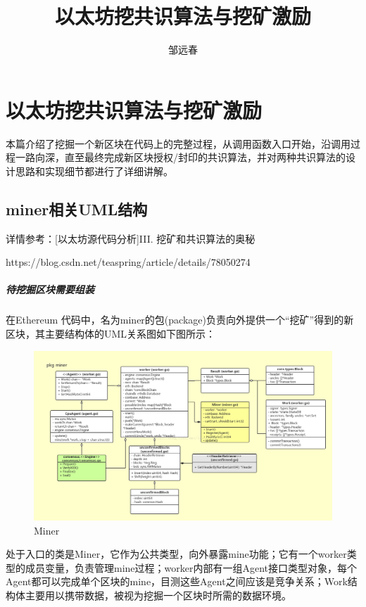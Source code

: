 \documentclass[UTF8]{ctexart}
\title{以太坊挖共识算法与挖矿激励}
\author{邹远春}
\date{}
\begin{document}
\maketitle
\newcommand\Emph{\textbf}
\else
\chapter{以太坊挖共识算法与挖矿激励}
\fi

本篇介绍了挖掘一个新区块在代码上的完整过程，从调用函数入口开始，沿调用过程一路向深，直至最终完成新区块授权/封印的共识算法，并对两种共识算法的设计思路和实现细节都进行了详细讲解。


\section{miner相关UML结构}

详情参考：[以太坊源代码分析]III. 挖矿和共识算法的奥秘 

https://blog.csdn.net/teaspring/article/details/78050274

\paragraph{待挖掘区块需要组装}

在Ethereum 代码中，名为miner的包(package)负责向外提供一个“挖矿”得到的新区块，其主要结构体的UML关系图如下图所示：

\begin{figure}
	\centering
	\includegraphics[scale=0.3]{miner.png}
	\caption{Miner}
	\label{miner}
\end{figure}

处于入口的类是Miner，它作为公共类型，向外暴露mine功能；它有一个worker类型的成员变量，负责管理mine过程；worker内部有一组Agent接口类型对象，每个Agent都可以完成单个区块的mine，目测这些Agent之间应该是竞争关系；Work结构体主要用以携带数据，被视为挖掘一个区块时所需的数据环境。
\end{document}
